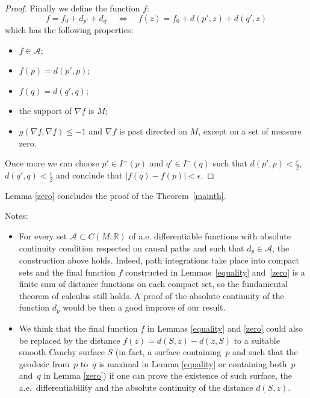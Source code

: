 \documentclass[11pt]{article}
\newcommand{\abs}[1]{\left\vert {#1} \right\vert}
\newcommand{\setR}{{\mathbb R}}
\newcommand{\Lequi}{\Longleftrightarrow}
\begin{document}
\begin{proof}
Finally we def\/ine the function $f$:
\[
f = f_0 + d_{p'} + d_{q'}  \quad \Lequi \quad   f(z) = f_0 + d(p',z) + d(q',z)
\]
which has the following properties:
\begin{itemize}\itemsep=0pt
\item $f\in\mathcal A$;
\item $f(p)= d(p',p)$;
\item $f(q)= d(q',q)$;
\item the support of $\nabla f$ is $M$;
\item $g( \nabla f, \nabla f) \leq -1$ and $\nabla f$ is past directed on $M$, except on a set of measure zero.
\end{itemize}

Once more we can choose $p' \in I^-(p)$ and $q' \in I^-(q)$ such that $d(p',p) < \frac\epsilon2$, $d(q',q) < \frac\epsilon2$ and conclude that $\abs{f(q)-f(p)} < \epsilon$.
\end{proof}

Lemma \ref{zero} concludes the proof of the Theorem~\ref{mainth}.

Notes:
\begin{itemize}\itemsep=0pt
\item For every set $\mathcal A \subset C(M,\setR)$ of a.e. dif\/ferentiable functions with absolute continuity condition respected on causal paths and such that $d_p \in \mathcal A$, the construction above holds. Indeed, path integrations take place into compact sets and the f\/inal function $f$ constructed in Lemmas~\ref{equality} and~\ref{zero} is a f\/inite sum of distance functions on each compact set, so the fundamental theorem of calculus still holds. A proof of the absolute continuity of the function $d_p$ would be then a good improve of our result.
\item We think that the f\/inal function $f$ in Lemmas \ref{equality} and \ref{zero} could also be replaced by the distance $f(z) = d(S,z) - d(z,S)$ to a suitable smooth Cauchy surface $S$ (in fact, a surface containing~$p$ and such that the geodesic from~$p$ to~$q$ is maximal in Lemma \ref{equality} or con\-taining both~$p$ and~$q$ in Lemma \ref{zero}) if one can prove the existence of such surface, the a.e.\ dif\/ferentiability and the absolute continuity of the distance $d(S,z)$.
\end{itemize}
\end{document}
